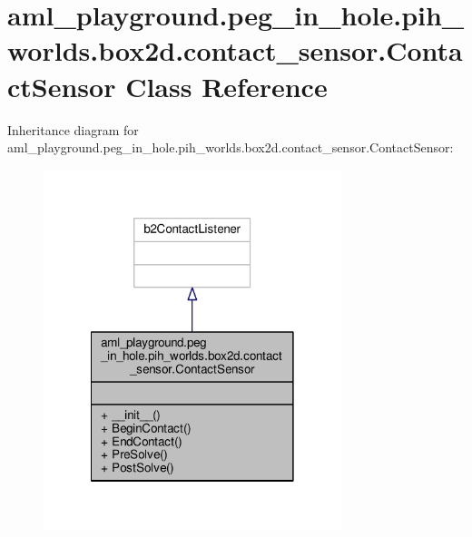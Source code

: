 \hypertarget{classaml__playground_1_1peg__in__hole_1_1pih__worlds_1_1box2d_1_1contact__sensor_1_1_contact_sensor}{\section{aml\-\_\-playground.\-peg\-\_\-in\-\_\-hole.\-pih\-\_\-worlds.\-box2d.\-contact\-\_\-sensor.\-Contact\-Sensor Class Reference}
\label{classaml__playground_1_1peg__in__hole_1_1pih__worlds_1_1box2d_1_1contact__sensor_1_1_contact_sensor}
}


Inheritance diagram for aml\-\_\-playground.\-peg\-\_\-in\-\_\-hole.\-pih\-\_\-worlds.\-box2d.\-contact\-\_\-sensor.\-Contact\-Sensor\-:
\nopagebreak
\begin{figure}[H]
\begin{center}
\leavevmode
\includegraphics[width=246pt]{classaml__playground_1_1peg__in__hole_1_1pih__worlds_1_1box2d_1_1contact__sensor_1_1_contact_sensor__inherit__graph}
\end{center}
\end{figure}


